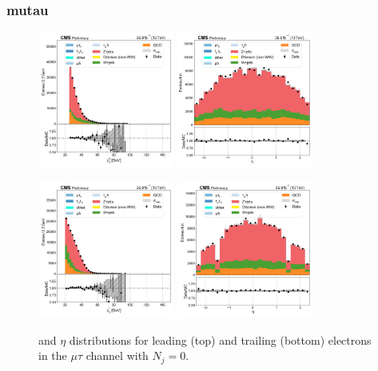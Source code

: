 \subsubsection{mutau}

\begin{figure}[htb!]
    \centering
    \includegraphics[width=0.4\textwidth]{chapters/Appendix/sectionPlots/figures/data_mc_overlays/mutau_2016_cat_eq0_eq0_signal_linear_lepton_lepton1_pt}
    \includegraphics[width=0.4\textwidth]{chapters/Appendix/sectionPlots/figures/data_mc_overlays/mutau_2016_cat_eq0_eq0_signal_linear_lepton_lepton1_eta}

    \includegraphics[width=0.4\textwidth]{chapters/Appendix/sectionPlots/figures/data_mc_overlays/mutau_2016_cat_eq0_eq0_signal_linear_lepton_lepton2_pt}
    \includegraphics[width=0.4\textwidth]{chapters/Appendix/sectionPlots/figures/data_mc_overlays/mutau_2016_cat_eq0_eq0_signal_linear_lepton_lepton2_eta}
    \caption{\pt and $\eta$ distributions for leading (top) and trailing
    (bottom) electrons in the $\mu\tau$ channel with $N_{j} = 0$.}
    \label{fig:mutau_1_kinematic}
\end{figure}


